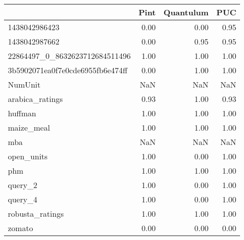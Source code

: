 \begin{tabular}{lrrr}
\toprule
{} &  Pint &  Quantulum &   PUC \\
\midrule
1438042986423                    &  0.00 &       0.00 &  0.95 \\
1438042987662                    &  0.00 &       0.95 &  0.95 \\
22864497\_0\_8632623712684511496   &  1.00 &       1.00 &  1.00 \\
3b5902071ea0f7e0cde6955fb6e474ff &  0.00 &       1.00 &  1.00 \\
NumUnit                          &   NaN &        NaN &   NaN \\
arabica\_ratings                  &  0.93 &       1.00 &  0.93 \\
huffman                          &  1.00 &       1.00 &  1.00 \\
maize\_meal                       &  1.00 &       1.00 &  1.00 \\
mba                              &   NaN &        NaN &   NaN \\
open\_units                       &  1.00 &       0.00 &  1.00 \\
phm                              &  1.00 &       1.00 &  1.00 \\
query\_2                          &  1.00 &       0.00 &  1.00 \\
query\_4                          &  1.00 &       0.00 &  1.00 \\
robusta\_ratings                  &  1.00 &       1.00 &  1.00 \\
zomato                           &  0.00 &       0.00 &  0.00 \\
\bottomrule
\end{tabular}
